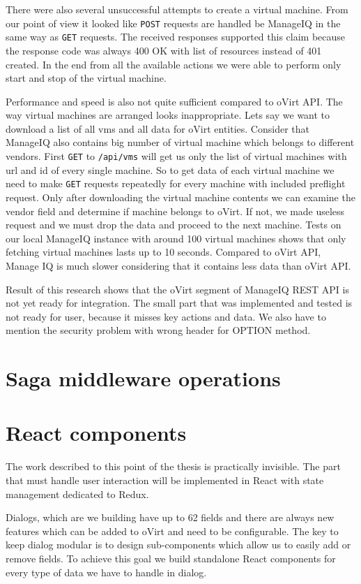 There were also several unsuccessful attempts to create a virtual machine. From our point of view it looked like \texttt{POST} requests are handled be ManageIQ in the same way as \texttt{GET} requests. The received responses supported this	claim because the response code was always 400 OK with list of resources instead of 401 created. In the end from all the available actions we were able to perform only start and stop of the virtual machine.

Performance and speed is also not quite sufficient compared to oVirt API. The way virtual machines are arranged looks inappropriate. Lets say we want to download a list of all vms and all data for oVirt entities. Consider that ManageIQ also contains big number of virtual machine which belongs to different vendors. First \texttt{GET} to \texttt{/api/vms} will get us only the list of virtual machines with url and id of every single machine. So to get data of each virtual machine we need to make \texttt{GET} requests repeatedly for every machine with included preflight request. Only after downloading the virtual machine contents we can examine the vendor field and determine if machine belongs to oVirt. If not, we made useless request and we must drop the data and proceed to the next machine. Tests on our local ManageIQ instance with around 100 virtual machines shows that only fetching virtual machines lasts up to 10 seconds. Compared to oVirt API, Manage IQ is much slower considering that it contains less data than oVirt API.  

Result of this research shows that the oVirt segment of ManageIQ REST API is not yet ready for integration. The small part that was implemented and tested is not ready for user, because it misses key actions and data. We also have to mention the security problem with wrong header for OPTION method.

\section{Saga middleware operations}

\section{React components}
The work described to this point of the thesis is practically invisible. The part that must handle user interaction will be implemented in React with state management dedicated to Redux. 

Dialogs, which are we building have up to 62 fields and there are always new features which can be added to oVirt and need to be configurable. The key to keep dialog modular is to design sub-components which allow us to easily add or remove fields. To achieve this goal we build standalone React components for every type of data we have to handle in dialog.

